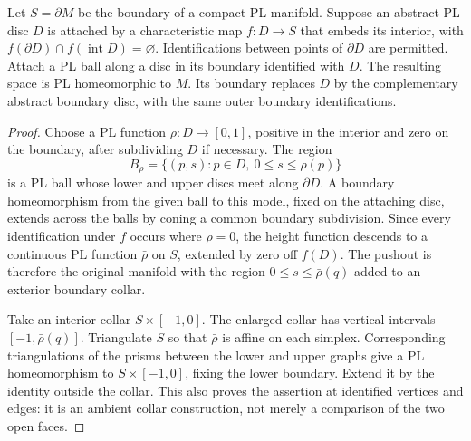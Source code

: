 \begin{lemma}
\label{fib:collar}
Let \(S=\partial M\) be the boundary of a compact PL manifold.  Suppose
an abstract PL disc \(D\) is attached by a characteristic map
\(f:D\to S\) that embeds its interior, with
\(f(\partial D)\cap f(\operatorname{int}D)=\varnothing\).
Identifications between points of \(\partial D\) are permitted.
Attach a PL ball along a disc in its boundary identified with \(D\).
The resulting space is PL homeomorphic to \(M\).  Its boundary replaces
\(D\) by the complementary abstract boundary disc, with the same outer
boundary identifications.
\end{lemma}
\begin{proof}
Choose a PL function \(\rho:D\to[0,1]\), positive in the interior and
zero on the boundary, after subdividing \(D\) if necessary.  The region
\[
 B_\rho=\{(p,s):p\in D,\ 0\leq s\leq\rho(p)\}
\]
is a PL ball whose lower and upper discs meet along \(\partial D\).
A boundary homeomorphism from the given ball to this model, fixed on
the attaching disc, extends across the balls by coning a common boundary
subdivision.  Since every identification under \(f\) occurs where
\(\rho=0\), the height function descends to a continuous PL function
\(\bar\rho\) on \(S\), extended by zero off \(f(D)\).
The pushout is therefore the original manifold with the region
\(0\leq s\leq\bar\rho(q)\) added to an exterior boundary collar.

Take an interior collar \(S\times[-1,0]\).  The enlarged collar has
vertical intervals \([-1,\bar\rho(q)]\).  Triangulate \(S\) so that
\(\bar\rho\) is affine on each simplex.  Corresponding triangulations
of the prisms between the lower and upper graphs give a PL homeomorphism
to \(S\times[-1,0]\), fixing the lower boundary.  Extend it by the
identity outside the collar.  This also proves the assertion at identified
vertices and edges: it is an ambient collar construction, not merely a
comparison of the two open faces.
\end{proof}

